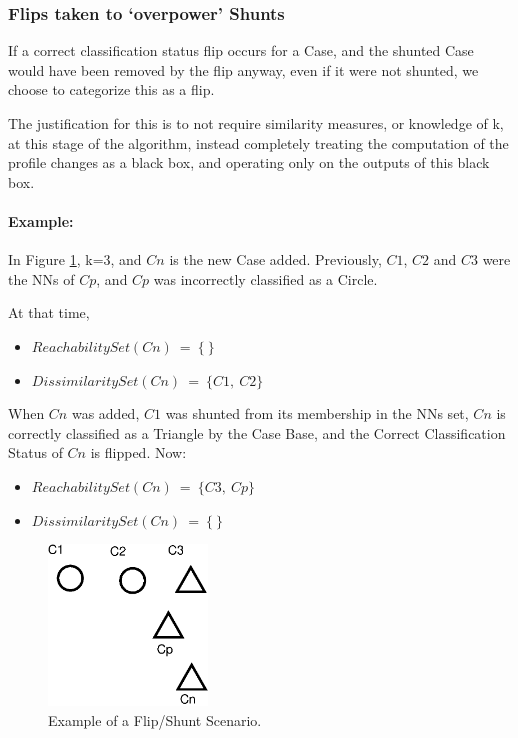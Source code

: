 \documentclass[a4paper,11pt]{report}
\begin{document}
\subsubsection{Flips taken to `overpower' Shunts}
If a correct classification status flip occurs for a Case, and the shunted Case would have been removed by the flip anyway, even if it were not shunted, we choose to categorize this as a flip. 

The justification for this is to not require similarity measures, or knowledge of k, at this stage of the algorithm, instead completely treating the computation of the profile changes as a black box, and operating only on the outputs of this black box.

\paragraph{Example:} In Figure \ref{fig:flipprecedence}, k=3, and $Cn$ is the new Case added. Previously, $C1$, $C2$ and $C3$ were the NNs of $Cp$, and $Cp$ was incorrectly classified as a Circle. 

At that time,
\begin{itemize}
	\item $ReachabilitySet(Cn)~=~\{~\}$
	\item $DissimilaritySet(Cn)~=~\{C1,~C2\}$
\end{itemize}

\begin{samepage}
When $Cn$ was added, $C1$ was shunted from its membership in the NNs set, $Cn$ is correctly classified as a Triangle by the Case Base, and the Correct Classification Status of $Cn$ is flipped. Now:
\begin{itemize}
	\item $ReachabilitySet(Cn)~=~\{C3,~Cp\}$
	\item $DissimilaritySet(Cn)~=~\{~\}$
\end{itemize}
\end{samepage}

\begin{figure}[h!] \centering
\includegraphics[width=120pt]{./Drawn/FlipPrecedence}
\caption{Example of a Flip/Shunt Scenario.}
\label{fig:flipprecedence}
\end{figure}
\end{document}
